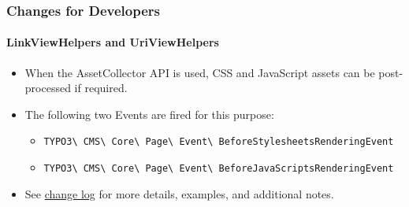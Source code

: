 \begin{frame}[fragile]
	\frametitle{Changes for Developers}
	\framesubtitle{LinkViewHelpers and UriViewHelpers}

	\begin{itemize}
		\item When the AssetCollector API is used, CSS and JavaScript assets
			can be post-processed if required.
		\item The following two Events are fired for this purpose:
			\begin{itemize}\smaller
				\item \texttt{TYPO3\textbackslash
					CMS\textbackslash
					Core\textbackslash
					Page\textbackslash
					Event\textbackslash
					BeforeStylesheetsRenderingEvent}
				\item \texttt{TYPO3\textbackslash
					CMS\textbackslash
					Core\textbackslash
					Page\textbackslash
					Event\textbackslash
					BeforeJavaScriptsRenderingEvent}
			\end{itemize}

		\item See
			\href{https://docs.typo3.org/c/typo3/cms-core/master/en-us/Changelog/10.4/Feature-90899-IntroduceAssetPreRenderingEvents.html}{change log}
			for more details, examples, and additional notes.
	\end{itemize}

\end{frame}

